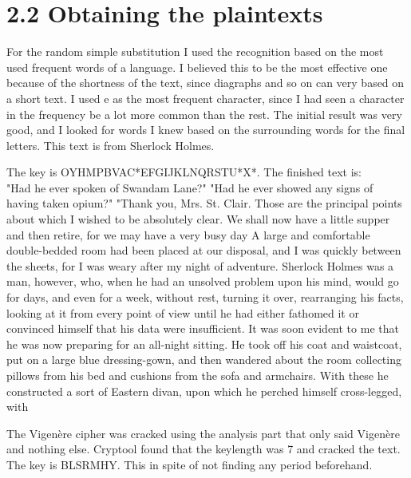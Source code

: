 \section*{2.2 Obtaining the plaintexts}

For the random simple substitution I used the recognition based on the most used frequent words of a language.
I believed this to be the most effective one because of the shortness of the text, since diagraphs and so on can very based on a short text.
I used e as the most frequent character, since I had seen a character in the frequency be a lot more common than the rest.
The initial result was very good, and I looked for words I knew based on the surrounding words for the final letters.
This text is from Sherlock Holmes.

The key is OYHMPBVAC*EFGIJKLNQRSTU*X*.
The finished text is: \\
"Had he ever spoken of Swandam Lane?"
"Had he ever showed any signs of having taken opium?"
"Thank you, Mrs. St. Clair. Those are the principal points about
which I wished to be absolutely clear. We shall now have a little
supper and then retire, for we may have a very busy day 
A large and comfortable double-bedded room had been placed at our
disposal, and I was quickly between the sheets, for I was weary
after my night of adventure. Sherlock Holmes was a man, however,
who, when he had an unsolved problem upon his mind, would go for
days, and even for a week, without rest, turning it over,
rearranging his facts, looking at it from every point of view
until he had either fathomed it or convinced himself that his
data were insufficient. It was soon evident to me that he was now
preparing for an all-night sitting. He took off his coat and
waistcoat, put on a large blue dressing-gown, and then wandered
about the room collecting pillows from his bed and cushions from
the sofa and armchairs. With these he constructed a sort of
Eastern divan, upon which he perched himself cross-legged, with



The Vigenère cipher was cracked using the analysis part that only said Vigenère and nothing else.
Cryptool found that the keylength was 7 and cracked the text.
The key is BLSRMHY.
This in spite of not finding any period beforehand.

